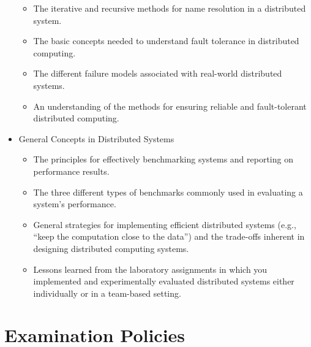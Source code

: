 \begin{itemize}[leftmargin=0.25in]
\begin{itemize}[leftmargin=0in]
      \item The iterative and recursive methods for name resolution in a distributed system.

      \item The basic concepts needed to understand fault tolerance in distributed computing.

      \item The different failure models associated with real-world distributed systems.

      \item An understanding of the methods for ensuring reliable and fault-tolerant distributed computing.

    \end{itemize}

  \item General Concepts in Distributed Systems

    \vspace*{-.05in}
    \begin{itemize}[leftmargin=0in]

      \itemsep 0in

      \item The principles for effectively benchmarking systems and reporting on performance results.

      \item The three different types of benchmarks commonly used in evaluating a system's performance.

      \item General strategies for implementing efficient distributed systems (e.g., ``keep the computation close to the
        data'') and the trade-offs inherent in designing distributed computing systems.

      \item Lessons learned from the laboratory assignments in which you implemented and experimentally evaluated
        distributed systems either individually or in a team-based setting.


    \end{itemize}

\end{itemize}

\vspace*{-.05in}
\section*{Examination Policies}

